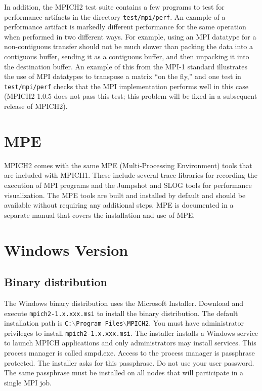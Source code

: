 \documentclass[dvipdfm,11pt]{article}
\begin{document}
In addition, the
MPICH2 test suite contains a few programs to test for performance artifacts in
the directory \texttt{test/mpi/perf}.  An example of a performance artifact is
markedly different performance for the same operation when performed in two
different ways.  For example, using an MPI datatype for a non-contiguous
transfer should not be much slower than packing the data into a contiguous
buffer, sending it as a contiguous buffer, and then unpacking it into the
destination buffer.  An example of this from the MPI-1 standard illustrates
the use of MPI datatypes to transpose a matrix ``on the fly,'' and one test in
\texttt{test/mpi/perf} checks that the MPI implementation performs well in
this case (MPICH2 1.0.5 does not pass this test; this problem will be fixed in
a subsequent release of MPICH2).

\section{MPE}
\label{sec:mpe}

MPICH2 comes with the same MPE (Multi-Processing Environment) tools that are
included with MPICH1.  These include several trace libraries for recording the
execution of MPI programs and the Jumpshot and SLOG tools for performance
visualization.  The MPE tools are built and installed by default and should be
available without requiring any additional steps.  MPE is documented in 
a separate manual that covers the installation and use of MPE.

\section{Windows Version}
\label{sec:windows}

\subsection{Binary distribution}
\label{sec:winbin}

The Windows binary distribution uses the Microsoft Installer.  Download and 
execute \texttt{mpich2-1.x.xxx.msi} to install the binary distribution.  The default 
installation path is \texttt{C:$\backslash$Program Files$\backslash$MPICH2}. 
You must have administrator privileges to install
\texttt{mpich2-1.x.xxx.msi}.  The installer  
installs a Windows service to launch MPICH applications and only administrators
may install services.  This process manager is called smpd.exe.  Access to 
the process manager is passphrase protected.  The installer asks for this 
passphrase.  Do not use your user password.  The same passphrase must be 
installed on all nodes that will participate in a single MPI job.
\end{document}
